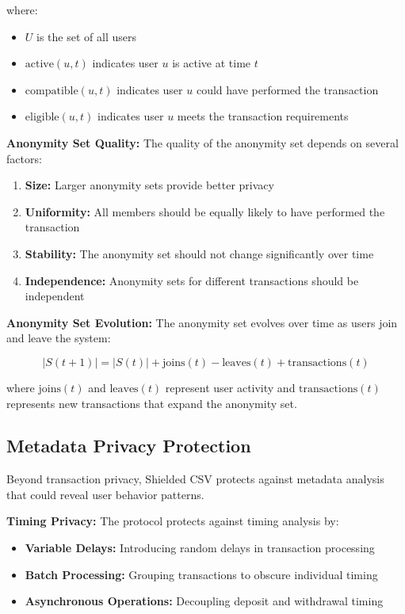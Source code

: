 \documentclass[11pt,a4paper]{article}
\begin{document}
where:
\begin{itemize}
    \item $U$ is the set of all users
    \item $\text{active}(u, t)$ indicates user $u$ is active at time $t$
    \item $\text{compatible}(u, t)$ indicates user $u$ could have performed the transaction
    \item $\text{eligible}(u, t)$ indicates user $u$ meets the transaction requirements
\end{itemize}

\textbf{Anonymity Set Quality:}
The quality of the anonymity set depends on several factors:

\begin{enumerate}
    \item \textbf{Size:} Larger anonymity sets provide better privacy
    \item \textbf{Uniformity:} All members should be equally likely to have performed the transaction
    \item \textbf{Stability:} The anonymity set should not change significantly over time
    \item \textbf{Independence:} Anonymity sets for different transactions should be independent
\end{enumerate}

\textbf{Anonymity Set Evolution:}
The anonymity set evolves over time as users join and leave the system:

\begin{equation}
|S(t+1)| = |S(t)| + \text{joins}(t) - \text{leaves}(t) + \text{transactions}(t)
\end{equation}

where $\text{joins}(t)$ and $\text{leaves}(t)$ represent user activity and $\text{transactions}(t)$ represents new transactions that expand the anonymity set.

\subsection{Metadata Privacy Protection}

Beyond transaction privacy, Shielded CSV protects against metadata analysis that could reveal user behavior patterns.

\textbf{Timing Privacy:}
The protocol protects against timing analysis by:

\begin{itemize}
    \item \textbf{Variable Delays:} Introducing random delays in transaction processing
    \item \textbf{Batch Processing:} Grouping transactions to obscure individual timing
    \item \textbf{Asynchronous Operations:} Decoupling deposit and withdrawal timing
\end{itemize}
\end{document}
